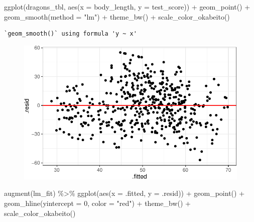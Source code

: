 \documentclass[
  letterpaper,
]{scrbook}
\newenvironment{Shaded}{\begin{snugshade}}{\end{snugshade}}
\newcommand{\AttributeTok}[1]{\textcolor[rgb]{0.40,0.45,0.13}{#1}}
\newcommand{\DecValTok}[1]{\textcolor[rgb]{0.68,0.00,0.00}{#1}}
\newcommand{\FunctionTok}[1]{\textcolor[rgb]{0.28,0.35,0.67}{#1}}
\newcommand{\NormalTok}[1]{\textcolor[rgb]{0.00,0.23,0.31}{#1}}
\newcommand{\SpecialCharTok}[1]{\textcolor[rgb]{0.37,0.37,0.37}{#1}}
\newcommand{\StringTok}[1]{\textcolor[rgb]{0.13,0.47,0.30}{#1}}
\begin{document}
\begin{Shaded}
\begin{Highlighting}[]
\FunctionTok{ggplot}\NormalTok{(dragons\_tbl, }\FunctionTok{aes}\NormalTok{(}\AttributeTok{x =}\NormalTok{ body\_length, }\AttributeTok{y =}\NormalTok{ test\_score)) }\SpecialCharTok{+}
  \FunctionTok{geom\_point}\NormalTok{() }\SpecialCharTok{+}
  \FunctionTok{geom\_smooth}\NormalTok{(}\AttributeTok{method =} \StringTok{"lm"}\NormalTok{) }\SpecialCharTok{+}
  \FunctionTok{theme\_bw}\NormalTok{() }\SpecialCharTok{+}
  \FunctionTok{scale\_color\_okabeito}\NormalTok{()}
\end{Highlighting}
\end{Shaded}

\begin{verbatim}
`geom_smooth()` using formula 'y ~ x'
\end{verbatim}

\begin{figure}[H]

{\centering \includegraphics{./stat-modeling-mixed_files/figure-pdf/unnamed-chunk-7-1.pdf}

}

\end{figure}

\begin{Shaded}
\begin{Highlighting}[]
\FunctionTok{augment}\NormalTok{(lm\_fit) }\SpecialCharTok{\%\textgreater{}\%} 
  \FunctionTok{ggplot}\NormalTok{(}\FunctionTok{aes}\NormalTok{(}\AttributeTok{x =}\NormalTok{ .fitted, }\AttributeTok{y =}\NormalTok{ .resid)) }\SpecialCharTok{+} 
  \FunctionTok{geom\_point}\NormalTok{() }\SpecialCharTok{+}
  \FunctionTok{geom\_hline}\NormalTok{(}\AttributeTok{yintercept =} \DecValTok{0}\NormalTok{, }\AttributeTok{color =} \StringTok{"red"}\NormalTok{) }\SpecialCharTok{+}
  \FunctionTok{theme\_bw}\NormalTok{() }\SpecialCharTok{+}
  \FunctionTok{scale\_color\_okabeito}\NormalTok{()}
\end{Highlighting}
\end{Shaded}
\end{document}
